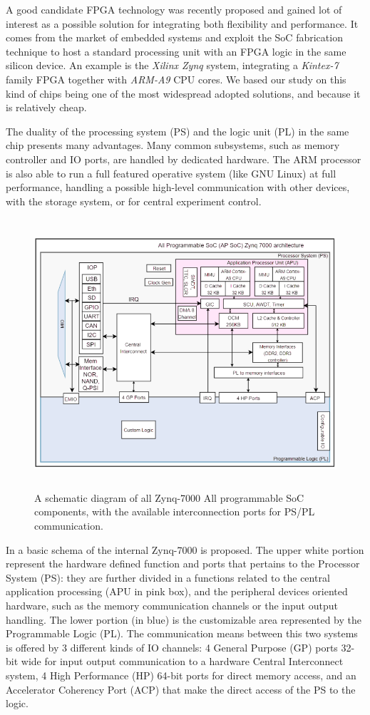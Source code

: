 A good candidate FPGA technology was recently proposed and gained lot of interest as a possible solution for integrating both flexibility and performance. It comes from the market of embedded systems and exploit the \ac{SoC} fabrication technique to host a standard processing unit with an FPGA logic in the same silicon device.
An example is the \textit{Xilinx Zynq} system, integrating a \textit{Kintex-7} family FPGA together with \textit{ARM-A9} CPU cores. 
We based our study on this kind of chips being one of the most widespread adopted solutions, and because it is relatively cheap.

The duality of the processing system (PS) and the logic unit (PL) in the same chip presents many advantages. Many common subsystems, such as memory controller and IO ports, are handled by dedicated hardware. The ARM processor is also able to run a full featured operative system (like GNU Linux) at full performance, handling a possible high-level communication with other devices, with the storage system, or for central experiment control. 

\begin{figure}
    \centering
    \includegraphics[height=10cm]{img/4_EmbeddedML/zynq_schema.png}
    \caption{A schematic diagram of all Zynq-7000 All programmable SoC components, with the available interconnection ports for PS/PL communication.}
    \label{fig:zinq-7000}
\end{figure}
%
In \Figure{\ref{fig:zinq-7000}} a basic schema of the internal Zynq-7000 is proposed. The upper white portion represent the hardware defined function and ports that pertains to the Processor System (PS): they are further divided in a functions related to the central application processing (APU in pink box), and the peripheral devices oriented hardware, such as the memory communication channels or the input output handling. The lower portion (in blue) is the customizable area represented by the Programmable Logic (PL).
The communication means between this two systems is offered by 3 different kinds of IO channels: 4 General Purpose (GP) ports 32-bit wide for input output communication to a hardware Central Interconnect system, 4 High Performance (HP) 64-bit ports for direct memory access, and an Accelerator Coherency Port (ACP) that make the direct access of the PS to the logic.

